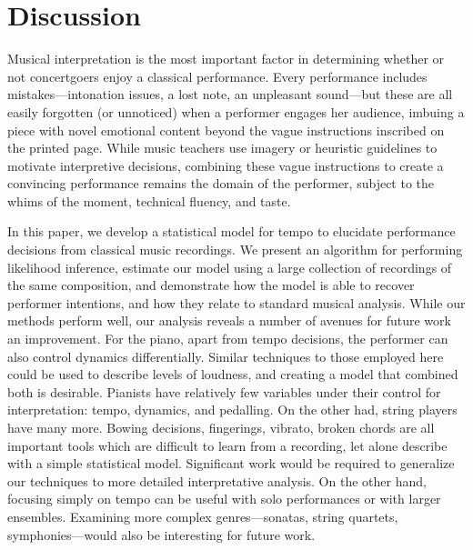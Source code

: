 \documentclass[aoas]{imsart}
\begin{document}

\section{Discussion}
\label{sec:discussion}


Musical interpretation is the most important factor 
in determining whether or not concertgoers enjoy a classical performance. Every
performance includes mistakes---intonation issues, a lost note, an
unpleasant sound---but these are all easily forgotten (or unnoticed) when a performer
engages her audience, imbuing a piece with novel emotional content
beyond the vague instructions inscribed on the printed page. While music teachers use
imagery or heuristic guidelines to motivate interpretive decisions, combining these
vague instructions to create a convincing performance remains the domain
of the performer, subject to the whims of the moment, technical
fluency, and taste.

In this paper, we develop a statistical model for tempo to elucidate performance
decisions from classical music recordings. We present an algorithm for
performing likelihood inference, estimate our model using a large
collection of recordings of the same composition, and demonstrate how
the model is able to recover performer intentions, and how they relate
to standard musical analysis. While our methods perform well, our
analysis reveals a number of avenues for future work an
improvement. For the piano, apart from tempo decisions, the performer
can also control dynamics differentially. Similar techniques to those
employed here could be used to describe levels of loudness, and
creating a model that combined both is desirable. Pianists have
relatively few variables under their control for interpretation:
tempo, dynamics, and pedalling. On the other had, string players have
many more. Bowing decisions, fingerings, vibrato, broken chords are
all important tools which are difficult to learn from a recording, let
alone describe with a simple statistical model. Significant work would
be required to generalize our techniques to more detailed
interpretative analysis. On the other hand, focusing simply on tempo
can be useful with solo performances or with larger
ensembles. Examining more complex genres---sonatas, string quartets,
symphonies---would also be interesting for future work.
\end{document}
